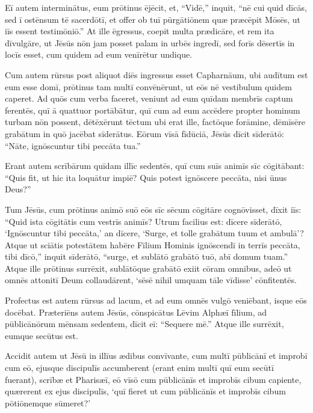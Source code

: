 \Versus Eī autem interminātus, eum prōtinus ējēcit,
\Versus et, ``Vidē,'' inquit, ``nē cui quid dīcās, sed ī ostēnsum tē sacerdōtī, et offer ob tuī pūrgātiōnem quæ præcēpit Mōsēs, ut iīs essent testimōniō.''
\Versus At ille ēgressus, coepit multa prædicāre, et rem ita dīvulgāre, ut Jēsūs nōn jam posset palam in urbēs ingredī, sed forīs dēsertīs in locīs esset, cum quidem ad eum venīrētur undique.



\Caput
\Versus Cum autem rūrsus post aliquot diēs ingressus esset Capharnāum,
\Versus ubi audītum est eum esse domī, prōtinus tam multī convēnērunt, ut eōs nē vestibulum quidem caperet.
\Versus Ad quōs cum verba faceret, veniunt ad eum quīdam membrīs captum ferentēs, quī ā quattuor portābātur,
\Versus quī cum ad eum accēdere propter hominum turbam nōn possent, dētēxērunt tēctum ubi erat ille, factōque forāmine, dēmīsēre grabātum in quō jacēbat sīderātus.
\Versus Eōrum vīsā fīdūciā, Jēsūs dīcit sīderātō: ``Nāte, ignōscuntur tibi peccāta tua.''

\Versus Erant autem scrībārum quīdam illīc sedentēs, quī cum suīs animīs sīc cōgitābant:
\Versus ``Quis fit, ut hic ita loquātur impiē? Quis potest ignōscere peccāta, nisi ūnus Deus?''

\Versus Tum Jēsūs, cum prōtinus animō suō eōs sīc sēcum cōgitāre cognōvisset, dīxit iīs: ``Quid ista cōgitātis cum vestrīs animīs?
\Versus Utrum facilius est: dīcere sīderātō, `Ignōscuntur tibi peccāta,' an dīcere, `Surge, et tolle grabātum tuum et ambulā'?
\Versus Atque ut sciātis potestātem habēre Fīlium Hominis ignōscendī in terrīs peccāta,
\Versus tibi dīcō,'' inquit sīderātō, ``surge, et sublātō grabātō tuō, abī domum tuam.''
\Versus Atque ille prōtinus surrēxit, sublātōque grabātō exiit cōram omnibus, adeō ut omnēs attonitī Deum collaudārent, `sēsē nihil umquam tāle vīdisse' cōnfitentēs.

\Versus Profectus est autem rūrsus ad lacum, et ad eum omnēs vulgō veniēbant, isque eōs docēbat.
\Versus Præteriēns autem Jēsūs, cōnspicātus Lēvim Alphæī fīlium, ad pūblicānōrum mēnsam sedentem, dīcit eī: ``Sequere mē.'' Atque ille surrēxit, eumque secūtus est.

\Versus Accidit autem ut Jēsū in illīus ædibus convīvante, cum multī pūblicānī et improbī cum eō, ejusque discipulīs accumberent (erant enim multī quī eum secūtī fuerant),
\Versus scrībæ et Pharisæī, eō vīsō cum pūblicānīs et improbīs cibum capiente, quærerent ex ejus discipulīs, `quī fieret ut cum pūblicānīs et improbīs cibum pōtiōnemque sūmeret?'

